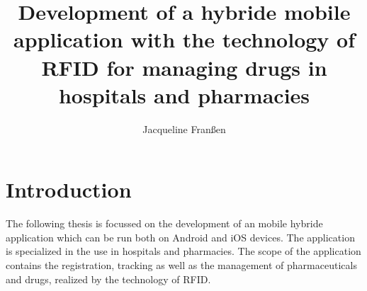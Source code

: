 \documentclass[12pt,a4paper]{book}
\author{Jacqueline Franßen}
\title{Development of a hybride mobile application with the technology of RFID for managing drugs in hospitals and pharmacies}
\newcommand\BackgroundPic{
\put(70,-40){
\parbox[b][\paperheight]{\paperwidth}{%
\texttt{[image: marca\_agua]}%
}}}
\begin{document}
\pagestyle{bloque_inicial} %


\cleardoublepage
\cleardoublepage
\tableofcontents
\cleardoublepage
{}
\listoffigures
\cleardoublepage
{}
\listoftables


\newpage{} %
\pagestyle{doc_body} %

\chapter{\textbf{Introduction}}
The following thesis is focussed on the development of an mobile hybride application which can be run both on Android and iOS devices. The application is specialized in the use in hospitals and pharmacies. The scope of the application contains the registration, tracking as well as the management of pharmaceuticals and drugs, realized by the technology of RFID.






%
\cleardoublepage
{} %
\end{document}
